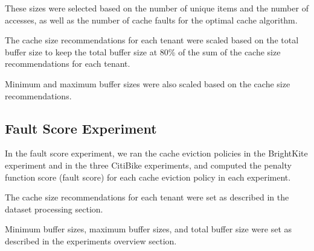 These sizes were selected based on the number of unique items and the number of accesses, as 
well as the number of cache faults for the optimal cache algorithm.

The cache size recommendations for each tenant were scaled based on the total buffer size to 
keep the total buffer size at 80\% of the sum of the cache size recommendations for each tenant.

Minimum and maximum buffer sizes were also scaled based on the cache size recommendations.

\subsection{Fault Score Experiment}

In the fault score experiment, we ran the cache eviction policies in the BrightKite experiment 
and in the three CitiBike experiments, and computed the penalty function score (fault score) 
for each cache eviction policy in each experiment.

The cache size recommendations for each tenant were set as described in the dataset processing 
section.

Minimum buffer sizes, maximum buffer sizes, and total buffer size were set as described in 
the experiments overview section.